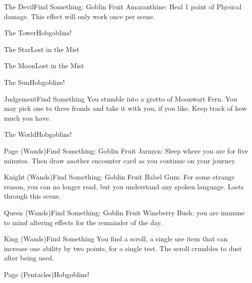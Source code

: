\documentclass[green]{gl2018}
\begin{document}
\begin{location}{The Devil}{Find Something: Goblin Fruit}
Amaranthine: Heal 1 point of Physical damage.  This effect will only work once per scene.
\end{location}
\begin{location}{The Tower}{Hobgoblins!}
\end{location}
\begin{location}{The Star}{Lost in the Mist}
\end{location}
\begin{location}{The Moon}{Lost in the Mist}
\end{location}
\begin{location}{The Sun}{Hobgoblins!}
\end{location}
\begin{location}{Judgement}{Find Something}
You stumble into a grotto of Moonwort Fern.  You may pick one to three fronds and take it with you, if you like.  Keep track of how much you have.
\end{location}
\begin{location}{The World}{Hobgoblins!}
\end{location}
\begin{location}{Page (Wands)}{Find Something: Goblin Fruit}
Jarmyn: Sleep where you are for five minutes.  Then draw another encounter card as you continue on your journey.
\end{location}
\begin{location}{Knight (Wands)}{Find Something: Goblin Fruit}
Babel Gum:  For some strange reason, you can no longer read, but you understand any spoken language.  Lasts through this scene.
\end{location}
\begin{location}{Queen (Wands)}{Find Something: Goblin Fruit}
Wineberry Bush: you are immune to mind altering effects for the remainder of the day.
\end{location}
\begin{location}{King (Wands)}{Find Something}
You find a scroll, a single use item that can increase one ability by two points, for a single test.  The scroll crumbles to dust after being used.
\end{location}
\begin{location}{Page (Pentacles)}{Hobgoblins!}
\end{location}
\end{document}
